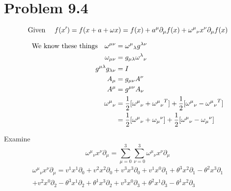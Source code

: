 \documentclass{article}
\begin{document}
\section*{Problem 9.4}

\[\qq*{Given } f(x^\prime) = f(x+a+\omega x) = f(x)+a^\mu \partial_\mu f(x)+{\omega^\mu}_\nu x^\nu \partial_\mu f(x)\]

\begin{align*}
	\qq*{We know these things}\omega^{\mu\nu} & ={\omega^\mu}_\lambda g^{\lambda\nu}                                                                   \\
	\omega_{\mu\nu}                           & = g_{\mu\lambda} {\omega^\lambda}_\nu                                                                  \\
	g^{\mu\lambda}g_{\lambda\nu}              & = I                                                                                                    \\
	A_\mu                                     & =g_{\mu\nu}A^\nu                                                                                       \\
	A^\mu                                     & =g^{\mu\nu}A_\nu                                                                                       \\
	{\omega^\mu}_\nu                          & =\frac{1}{2}[{\omega^\mu}_\nu+{{\omega^\mu}_\nu}^T]+\frac{1}{2}[{\omega^\mu}_\nu-{{\omega^\mu}_\nu}^T] \\
	                                          & =\frac{1}{2}[{\omega^\mu}_\nu+{\omega_\mu}^\nu]+\frac{1}{2}[{\omega^\mu}_\nu-{\omega_\mu}^\nu]
\end{align*}




Examine \[{\omega^\mu}_\nu x^\nu \partial_\mu=\sum^3_{\mu=0}\sum^3_{\nu=0}{\omega^\mu}_\nu x^\nu \partial_\mu\]
\begin{multline*}
	{\omega^\mu}_\nu x^\nu \partial_\mu=
	v^1 x^1 \partial_0+v^2 x^2 \partial_0+v^3 x^3 \partial_0+
	v^1 x^0 \partial_1+\theta^3 x^2 \partial_1-\theta^2 x^3 \partial_1\\+ 
	v^2 x^0 \partial_2-\theta^3 x^1 \partial_2+\theta^1 x^3 \partial_2+
	v^3 x^0 \partial_3+\theta^2 x^1 \partial_3-\theta^1 x^2 \partial_3
\end{multline*}
\end{document}
